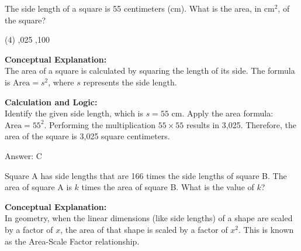 \documentclass[11pt,paper=a4,answers]{exam}
\begin{document}
\begin{questions}
\pointsinrightmargin
\pointsdroppedatright
\marksnotpoints
{}
\pointformat{\boldmath\themarginpoints}
\bracketedpoints



\question
The side length of a square is 55 centimeters (cm). What is the area, in $\text{cm}^2$, of the square?
\begin{tasks}(4)
    ,025
    ,100
\end{tasks}

\begin{solution}
\textbf{Conceptual Explanation:} \\
The area of a square is calculated by squaring the length of its side. The formula is $\text{Area} = s^2$, where $s$ represents the side length.

\vspace{30pt}

\textbf{Calculation and Logic:} \\
Identify the given side length, which is $s = 55 \text{ cm}$. Apply the area formula: $\text{Area} = 55^2$. Performing the multiplication $55 \times 55$ results in 3,025. Therefore, the area of the square is 3,025 square centimeters.

\vspace{30pt}

Answer: \colorbox{yellow!100}{C}
\end{solution}

\vspace{60pt}

\question
Square A has side lengths that are 166 times the side lengths of square B. The area of square A is $k$ times the area of square B. What is the value of $k$?

\begin{solution}
\textbf{Conceptual Explanation:} \\
In geometry, when the linear dimensions (like side lengths) of a shape are scaled by a factor of $x$, the area of that shape is scaled by a factor of $x^2$. This is known as the Area-Scale Factor relationship.


\end{solution}
\end{questions}
\end{document}

